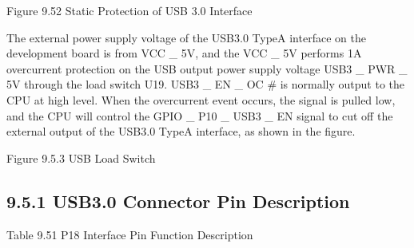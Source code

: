 \documentclass[letterpaper,10pt,openany,english]{sphinxmanual}
\begin{document}
\sphinxAtStartPar
{}

\sphinxAtStartPar
Figure 9.5\sphinxhyphen{}2 Static Protection of USB 3.0 Interface

\sphinxAtStartPar
The external power supply voltage of the USB3.0 Type\sphinxhyphen{}A interface on the development board is from VCC \_ 5V, and the VCC \_ 5V performs 1A overcurrent protection on the USB output power supply voltage USB3 \_ PWR \_ 5V through the load switch U19. USB3 \_ EN \_ OC \# is normally output to the CPU at high level. When the overcurrent event occurs, the signal is pulled low, and the CPU will control the GPIO \_ P10 \_ USB3 \_ EN signal to cut off the external output of the USB3.0 Type\sphinxhyphen{}A interface, as shown in the figure.

\sphinxAtStartPar
{}

\sphinxAtStartPar
Figure 9.5.3 USB Load Switch


\subsection{9.5.1 USB3.0 Connector Pin Description}
\label{\detokenize{hardware:usb3-0-connector-pin-description}}
\sphinxAtStartPar
Table 9.5\sphinxhyphen{}1 P18 Interface Pin Function Description
\end{document}
